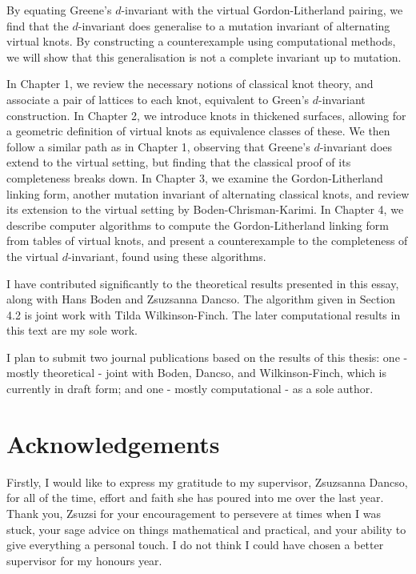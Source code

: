 \documentclass[12pt]{report}
\theoremstyle{upright}
\begin{document}
By equating Greene's $d$-invariant with the virtual Gordon-Litherland pairing, we find that the $d$-invariant does generalise to a mutation invariant of alternating virtual knots. By constructing a counterexample using computational methods, we will show that this generalisation is not a complete invariant up to mutation.

In Chapter 1, we review the necessary notions of classical knot theory, and associate a pair of lattices to each knot, equivalent to Green's $d$-invariant construction. In Chapter 2, we introduce knots in thickened surfaces, allowing for a geometric definition of virtual knots as equivalence classes of these. We then follow a similar path as in Chapter 1, observing that Greene's $d$-invariant does extend to the virtual setting, but finding that the classical proof of its completeness breaks down. In Chapter 3, we examine the Gordon-Litherland linking form, another mutation invariant of alternating classical knots, and review its extension to the virtual setting by Boden-Chrisman-Karimi. In Chapter 4, we describe computer algorithms to compute the Gordon-Litherland linking form from tables of virtual knots, and present a counterexample to the completeness of the virtual $d$-invariant, found using these algorithms.

I have contributed significantly to the theoretical results presented in this essay, along with Hans Boden and Zsuzsanna Dancso. The algorithm given in Section 4.2 is joint work with Tilda Wilkinson-Finch. The later computational results in this text are my sole work.

I plan to submit two journal publications based on the results of this thesis: one - mostly theoretical - joint with Boden, Dancso, and Wilkinson-Finch, which is currently in draft form; and one - mostly computational - as a sole author.

\chapter*{Acknowledgements}

Firstly, I would like to express my gratitude to my supervisor, Zsuzsanna Dancso, for all of the time, effort and faith she has poured into me over the last year. Thank you, Zsuzsi for your encouragement to persevere at times when I was stuck, your sage advice on things mathematical and practical, and your ability to give everything a personal touch. I do not think I could have chosen a better supervisor for my honours year.
\end{document}
